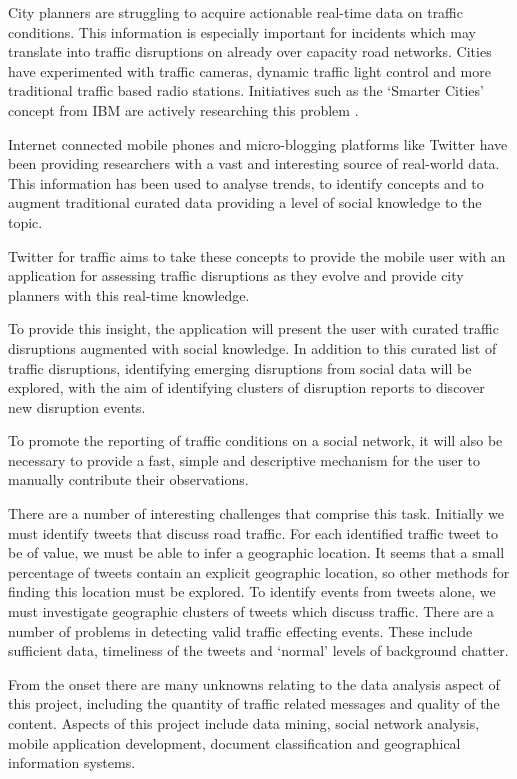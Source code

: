 City planners are struggling to acquire actionable real-time data on traffic
conditions. This information is especially important for incidents which may translate
into traffic disruptions on already over capacity road networks. Cities have
experimented with traffic cameras, dynamic traffic light control and more
traditional traffic based radio stations. Initiatives such as the `Smarter
Cities’ concept from IBM are actively researching this problem
\cite{website:smarter_cities}.

Internet connected mobile phones and micro-blogging platforms like Twitter have
been providing researchers with a vast and interesting source of real-world
data. This information has been used to analyse trends, to identify concepts and to
augment traditional curated data providing a level of social knowledge to the
topic.

Twitter for traffic aims to take these concepts to provide the mobile user with
an application for assessing traffic disruptions as they evolve and provide
city planners with this real-time knowledge.

To provide this insight, the application will present the user with curated
traffic disruptions augmented with social knowledge. In addition to this
curated list of traffic disruptions,
identifying emerging disruptions from social data will be explored, with
the aim of identifying clusters of disruption reports to discover new
disruption events.

To promote the reporting of traffic conditions on a social network, it will
also be necessary to provide a fast, simple and descriptive mechanism for the
user to manually contribute their observations.

There are a number of interesting challenges that comprise this task. Initially
we must identify tweets that discuss road traffic. For each identified traffic
tweet to be of value, we must be able to infer a geographic location.
It seems that a small percentage of tweets contain an explicit
geographic location, so other methods for finding this location must be
explored. To identify events from tweets alone, we must investigate geographic
clusters of tweets which discuss traffic. There are a number of problems in
detecting valid traffic effecting events. These include sufficient data,
timeliness of the tweets and `normal' levels of background chatter.

From the onset there are many unknowns relating to the data analysis aspect of
this project, including the quantity of traffic related messages and quality of
the content. Aspects of this project include data mining, social network
analysis, mobile application development, document classification and
geographical information systems.

